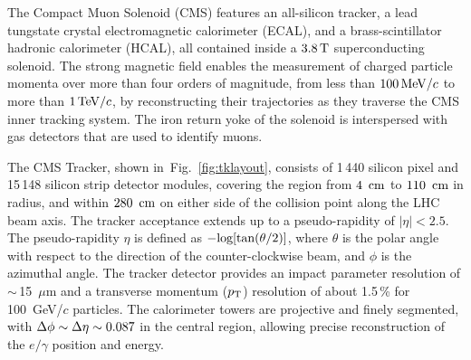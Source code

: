 \documentclass[a4paper]{jpconf}
\begin{document}
The Compact Muon Solenoid (CMS) features an all-silicon tracker, a lead tungstate crystal electromagnetic calorimeter (ECAL), and a brass-scintillator hadronic calorimeter (HCAL), all contained inside a  $3.8\,{\rm T}$  superconducting solenoid.
The strong magnetic field  enables the measurement of charged
particle momenta over more than four orders of magnitude, from less than
$100{\rm \, MeV}/c$ to more than $1{\rm \, TeV}/c$, by reconstructing their trajectories as they
traverse the CMS inner tracking system.  
The iron return yoke of the solenoid is interspersed with gas detectors that are used to identify muons.


The CMS Tracker, shown
in~Fig.~\ref{fig:tklayout}, consists of 1\,440 silicon pixel and 15\,148 silicon strip detector modules, covering
the region from $4~\rm \, cm$ to $110~\rm \, cm$ in radius, and within $280~\rm \, cm$ on either
side of the collision point along the LHC beam axis. The tracker
acceptance extends up to a pseudo-rapidity of $\left | \eta \right | < 2.5$.
The pseudo-rapidity $\eta$ is defined as $\rm  -log[tan(\theta/2)]$, where $\theta$ is the polar angle with respect to the direction of the counter-clockwise beam, and $\phi$ is the azimuthal angle.
The tracker detector  provides an impact parameter resolution of $\sim$\,15~$\mu$m and a transverse momentum ($p_{\rm T}$) resolution of about 1.5\,\% for 100~GeV/$c$ particles.
The calorimeter towers are projective and finely segmented, with $\rm \Delta\phi \sim \Delta\eta \sim 0.087$ in the central region, allowing precise reconstruction of the $e/\gamma$ position and energy.  
\end{document}
